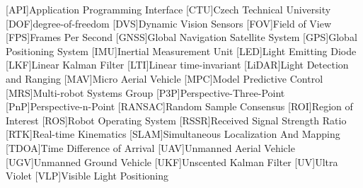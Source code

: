 
\begin{acronym}
  [API]{Application Programming Interface}
  [CTU]{Czech Technical University}
  [DOF]{degree-of-freedom}
  [DVS]{Dynamic Vision Sensors}
  [FOV]{Field of View}
  [FPS]{Frames Per Second}
  [GNSS]{Global Navigation Satellite System}
  [GPS]{Global Positioning System}
  [IMU]{Inertial Measurement Unit}
  [LED]{Light Emitting Diode}
  [LKF]{Linear Kalman Filter}
  [LTI]{Linear time-invariant}
  [LiDAR]{Light Detection and Ranging}
  [MAV]{Micro Aerial Vehicle}
  [MPC]{Model Predictive Control}
  [MRS]{Multi-robot Systems Group}
  [P3P]{Perspective-Three-Point}
  [PnP]{Perspective-n-Point}
  [RANSAC]{Random Sample Consensus}
  [ROI]{Region of Interest}
  [ROS]{Robot Operating System}
  [RSSR]{Received Signal Strength Ratio}
  [RTK]{Real-time Kinematics}
  [SLAM]{Simultaneous Localization And Mapping}
  [TDOA]{Time Difference of Arrival}
  [UAV]{Unmanned Aerial Vehicle}
  [UGV]{Unmanned Ground Vehicle}
  [UKF]{Unscented Kalman Filter}
  [UV]{Ultra Violet}
  [VLP]{Visible Light Positioning}
\end{acronym}
